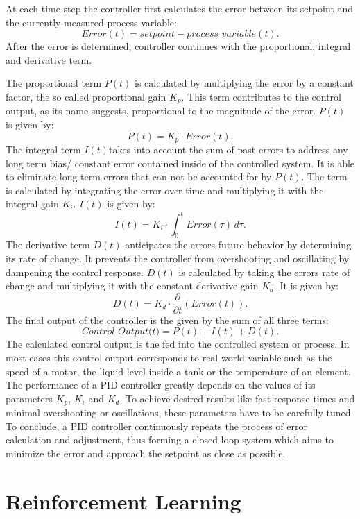 At each time step the controller first calculates the error between its setpoint and the currently measured process variable: 
\[
	Error(t) = setpoint - \textit{process variable}(t)
.\]
After the error is determined, controller continues with the proportional, integral and derivative term.

The proportional term $P(t)$ is calculated by multiplying the error by a constant factor, the so called proportional gain $K_p$.
This term contributes to the control output, as its name suggests, proportional to the magnitude of the error.
$P(t)$ is given by:
\[
	P(t) = K_p \cdot Error(t)
.\]
The integral term $I(t)$takes into account the sum of past errors to address any long term bias/ constant error contained inside of the controlled system.
It is able to eliminate long-term errors that can not be accounted for by $P(t)$.
The term is calculated by integrating the error over time and multiplying it with the integral gain $K_i$.
$I(t)$ is given by:
\[
	I(t) = K_i \cdot \int_{0}^{t} Error(\tau) \,d\tau
.\]
The derivative term $D(t)$ anticipates the errors future behavior by determining its rate of change.
It prevents the controller from overshooting and oscillating by dampening the control response.
$D(t)$ is calculated by taking the errors rate of change and multiplying it with the constant derivative gain $K_d$.
It is given by:
\[
	D(t) = K_d \cdot \frac{\partial}{\partial t}(Error(t))
.\]
The final output of the controller is the given by the sum of all three terms:
\[
	\textit{Control Output(t)} = P(t) + I(t) + D(t)
.\]
The calculated control output is the fed into the controlled system or process.
In most cases this control output corresponds to real world variable such as the speed of a motor, the liquid-level inside a tank or the temperature of an element.
The performance of a PID controller greatly depends on the values of its parameters $K_p$, $K_i$ and $K_d$.
To achieve desired results like fast response times and minimal overshooting or oscillations, these parameters have to be carefully tuned. 
To conclude, a PID controller continuously repeats the process of error calculation and adjustment, thus forming a closed-loop system which aims to minimize the error and approach the setpoint as close as possible.




\section{Reinforcement Learning}

